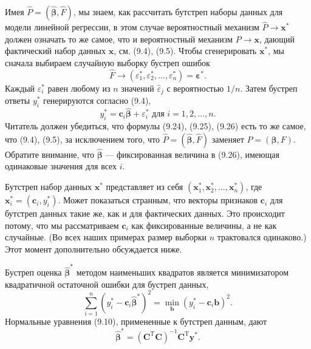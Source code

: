 Имея $\hat{P} = (\hat{\bm{\beta}}, \hat{F})$, мы знаем, как рассчитать бутстреп наборы данных для модели линейной регрессии, в этом случае вероятностный механизм $\hat{P} \to \textbf{x}^*$ должен означать то же самое, что и вероятностный механизм $P \to \textbf{x}$, дающий фактический набор данных $\textbf{x}$, см. (9.4), (9.5). Чтобы сгенерировать $\textbf{x}^*$, мы сначала выбираем случайную выборку бустреп ошибок
\begin{equation}
	\hat{F} \to (\varepsilon_1^*, \varepsilon_2^*, \ldots, \varepsilon_n^*) = \bm{\varepsilon}^*.
\end{equation}
Каждый $\varepsilon_i^*$ равен любому из $n$ значений $\hat{\varepsilon}_j$ с вероятностью $1 / n$. Затем бустреп ответы $y_i^*$ генерируются согласно (9.4),
\begin{equation}
	y_i^* = \textbf{c}_i \hat{\bm{\beta}} + \varepsilon_i^* \text{  для  } i = 1,2,\ldots,n.
\end{equation}
Читатель должен убедиться, что формулы (9.24), (9.25), (9.26) есть то же самое, что (9.4), (9.5), за исключением того, что $\hat{P} = (\hat{\bm{\beta}}, \hat{F})$ заменяет $P = (\bm{\beta}, F)$. Обратите внимание, что $\hat{\bm{\beta}}$ --- фиксированная величина в (9.26), имеющая одинаковые значения для всех $i$.

Бутстреп набор данных $\textbf{x}^*$ представляет из себя $(\textbf{x}_1^*, \textbf{x}_2^*, \ldots, \textbf{x}_n^*)$, где $\textbf{x}_i^* = (\textbf{c}_i, y_i^*)$. Может показаться странным, что векторы признаков $\textbf{c}_i$ для бутстреп данных такие же, как и для фактических данных. Это происходит потому, что мы рассматриваем $\textbf{c}_i$ как фиксированные величины, а не как случайные. (Во всех наших примерах размер выборки $n$ трактовался одинаково.) Этот момент дополнительно обсуждается ниже.

Бустреп оценка $\hat{\bm{\beta}}^*$ методом наименьших квадратов является минимизатором квадратичной остаточной ошибки для бустреп данных,
\begin{equation}
	\sum\limits_{i=1}^{n}(y_i^* - \textbf{c}_i \hat{\bm{\beta}}^*)^2 = \min_{\textbf{b}} (y_i^* - \textbf{c}_i \textbf{b})^2.
\end{equation}
Нормальные уравнения (9.10), примененные к бутстреп данным, дают
\begin{equation}
	\hat{\bm{\beta}}^* = (\textbf{C}^\text{T} \textbf{C})^{-1} \textbf{C}^\text{T} \textbf{y}^*.
\end{equation}

